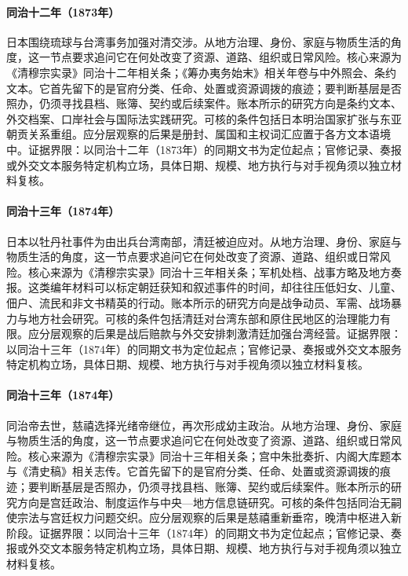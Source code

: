 \hypertarget{social:EQ-1873-JAPAN-RYUKYU-DISPUTE}{}\paragraph{同治十二年（1873年）}日本围绕琉球与台湾事务加强对清交涉。从地方治理、身份、家庭与物质生活的角度，这一节点要求追问它在何处改变了资源、道路、组织或日常风险。核心来源为《清穆宗实录》同治十二年相关条；《筹办夷务始末》相关年卷与中外照会、条约文本。它首先留下的是官府分类、任命、处置或资源调拨的痕迹；要判断基层是否照办，仍须寻找县档、账簿、契约或后续案件。账本所示的研究方向是条约文本、外交档案、口岸社会与国际法实践研究。可核的条件包括日本明治国家扩张与东亚朝贡关系重组。应分层观察的后果是册封、属国和主权词汇应置于各方文本语境中。证据界限：以同治十二年（1873年）的同期文书为定位起点；官修记录、奏报或外交文本服务特定机构立场，具体日期、规模、地方执行与对手视角须以独立材料复核。
\hypertarget{social:EQ-1874-JAPANESE-TAIWAN-EXPEDITION}{}\paragraph{同治十三年（1874年）}日本以牡丹社事件为由出兵台湾南部，清廷被迫应对。从地方治理、身份、家庭与物质生活的角度，这一节点要求追问它在何处改变了资源、道路、组织或日常风险。核心来源为《清穆宗实录》同治十三年相关条；军机处档、战事方略及地方奏报。这类编年材料可以标定朝廷获知和叙述事件的时间，却往往压低妇女、儿童、佃户、流民和非文书精英的行动。账本所示的研究方向是战争动员、军需、战场暴力与地方社会研究。可核的条件包括清廷对台湾东部和原住民地区的治理能力有限。应分层观察的后果是战后赔款与外交安排刺激清廷加强台湾经营。证据界限：以同治十三年（1874年）的同期文书为定位起点；官修记录、奏报或外交文本服务特定机构立场，具体日期、规模、地方执行与对手视角须以独立材料复核。
\hypertarget{social:EQ-1874-TONGZHI-DEATH}{}\paragraph{同治十三年（1874年）}同治帝去世，慈禧选择光绪帝继位，再次形成幼主政治。从地方治理、身份、家庭与物质生活的角度，这一节点要求追问它在何处改变了资源、道路、组织或日常风险。核心来源为《清穆宗实录》同治十三年相关条；宫中朱批奏折、内阁大库题本与《清史稿》相关志传。它首先留下的是官府分类、任命、处置或资源调拨的痕迹；要判断基层是否照办，仍须寻找县档、账簿、契约或后续案件。账本所示的研究方向是宫廷政治、制度运作与中央—地方信息链研究。可核的条件包括同治无嗣使宗法与宫廷权力问题交织。应分层观察的后果是慈禧重新垂帘，晚清中枢进入新阶段。证据界限：以同治十三年（1874年）的同期文书为定位起点；官修记录、奏报或外交文本服务特定机构立场，具体日期、规模、地方执行与对手视角须以独立材料复核。
